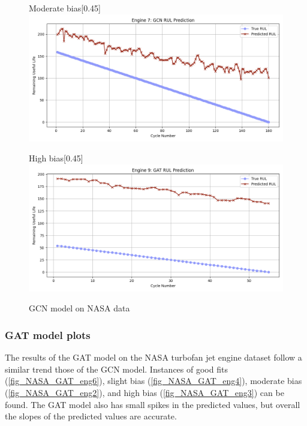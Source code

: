\documentclass[12pt]{article}
\begin{document}
\begin{figure}[H]
    \begin{subcaptionbox}{Moderate bias\label{fig_NASA_GCN_eng2}}[0.45\textwidth]
        {\includegraphics[width=\linewidth]{figures/NASA/NASA_GCN_eng2.png}}
    \end{subcaptionbox}
    \hfill
    \begin{subcaptionbox}{High bias\label{fig_NASA_GCN_eng3}}[0.45\textwidth]
        {\includegraphics[width=\linewidth]{figures/NASA/NASA_GAT_eng3.png}}
    \end{subcaptionbox}

    \caption{GCN model on NASA data}
    \label{GCN_NASA_all}
\end{figure}


\subsubsection{GAT model plots}

The results of the GAT model on the NASA turbofan jet engine dataset follow a similar trend those of the GCN model. Instances of good fits (\autoref{fig_NASA_GAT_eng6}), slight bias (\autoref{fig_NASA_GAT_eng4}), moderate bias (\autoref{fig_NASA_GAT_eng2}), and high bias (\autoref{fig_NASA_GAT_eng3}) can be found. The GAT model also has small spikes in the predicted values, but overall the slopes of the predicted values are accurate.
\end{document}
